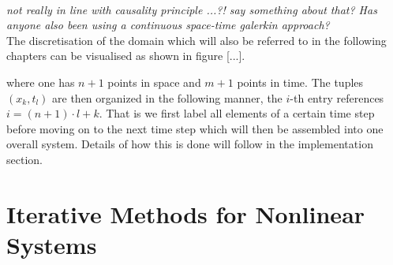 \documentclass[../draft_1.tex]{subfiles}
\begin{document}
\smallskip
\\
\textit{not really in line with causality principle ...?! say something about that? Has anyone also been using a continuous space-time galerkin approach?}
\smallskip
\\
The discretisation of the domain which will also be referred to in the following chapters can be visualised as shown in figure [...].
\begin{figure}[ht!]
	\centering
	
	
\end{figure}

where one has $n+1$ points in space and $m+1$ points in time. The tuples $(x_k, t_l)$ are then organized in the following manner, the $i$-th entry references $i = (n+1) \cdot l + k$. That is we first label all elements of a certain time step before moving on to the next time step which will then be assembled into one overall system. Details of how this is done will follow in the implementation section. %

\section{Iterative Methods for Nonlinear Systems}
\end{document}
